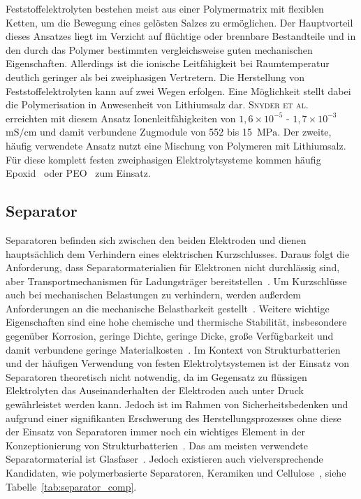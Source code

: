 Feststoffelektrolyten bestehen meist aus einer Polymermatrix mit flexiblen Ketten, um die Bewegung eines gelösten Salzes zu ermöglichen. Der Hauptvorteil dieses Ansatzes liegt im Verzicht auf flüchtige oder brennbare Bestandteile und in den durch das Polymer bestimmten vergleichsweise guten mechanischen Eigenschaften. Allerdings ist die ionische Leitfähigkeit bei Raumtemperatur deutlich geringer als bei zweiphasigen Vertretern. Die Herstellung von Feststoffelektrolyten kann auf zwei Wegen erfolgen. Eine Möglichkeit stellt dabei die Polymerisation in Anwesenheit von Lithiumsalz dar. \textsc{Snyder et al.}~\cite{Snyder2007, Snyder2009} erreichten mit diesem Ansatz Ionenleitfähigkeiten von $1,6 \times 10^{-5}$ - $1,7 \times 10^{-3}$ $\si{\milli \siemens \per \cm}$ und damit verbundene Zugmodule von 552 bis 15~$\si{\MPa}$. Der zweite, häufig verwendete Ansatz nutzt eine Mischung von Polymeren mit Lithiumsalz. Für diese komplett festen zweiphasigen Elektrolytsysteme kommen häufig Epoxid~\cite{Matsumoto2011,Munoz2021,Wang2020b} oder PEO~\cite{Moreno2011,Ji2010,Guo2021} zum Einsatz.

\subsection{Separator}

Separatoren befinden sich zwischen den beiden Elektroden und dienen hauptsächlich dem Verhindern eines elektrischen Kurzschlusses. Daraus folgt die Anforderung, dass Separatormaterialien für Elektronen nicht durchlässig sind, aber Transportmechanismen für Ladungsträger bereitstellen~\cite{Kurzweil2015}. Um Kurzschlüsse auch bei mechanischen Belastungen zu verhindern, werden außerdem Anforderungen an die mechanische Belastbarkeit gestellt~\cite{Asp2015}. Weitere wichtige Eigenschaften sind eine hohe chemische und thermische Stabilität, insbesondere gegenüber Korrosion, geringe Dichte, geringe Dicke, große Verfügbarkeit und damit verbundene geringe Materialkosten~\cite{Beard2019}. Im Kontext von Strukturbatterien und der häufigen Verwendung von festen Elektrolytsystemen ist der Einsatz von Separatoren theoretisch nicht notwendig, da im Gegensatz zu flüssigen Elektrolyten das Auseinanderhalten der Elektroden auch unter Druck gewährleistet werden kann. Jedoch ist im Rahmen von Sicherheitsbedenken und aufgrund einer signifikanten Erschwerung des Herstellungsprozesses ohne diese der Einsatz von Separatoren immer noch ein wichtiges Element in der Konzeptionierung von Strukturbatterien~\cite{Asp2015, Hubert2022}. Das am meisten verwendete Separatormaterial ist Glasfaser~\cite{Zhou2022}. Jedoch existieren auch vielversprechende Kandidaten, wie polymerbasierte Separatoren, Keramiken und Cellulose~\cite{Simon2008, Greenhalgh2023, Chaudhary2024a}, siehe Tabelle~\ref{tab:separator_comp}.

